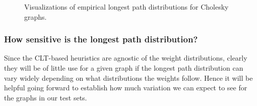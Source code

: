 \documentclass[12pt]{article}
\begin{document}
      \begin{figure}
	\centering	
	\caption{Visualizations of empirical longest path distributions for Cholesky graphs.}	
	\label{plot.emp_hists} 
      \end{figure}

      \subsubsection{How sensitive is the longest path distribution?}
      \label{subsubsect.sensitive}

      Since the CLT-based heuristics are agnostic of the weight distributions, clearly they will be of little use for a given graph if the longest path distribution can vary widely depending on what distributions the weights follow. Hence it will be helpful going forward to establish how much variation we can expect to see for the graphs in our test sets.
\end{document}
